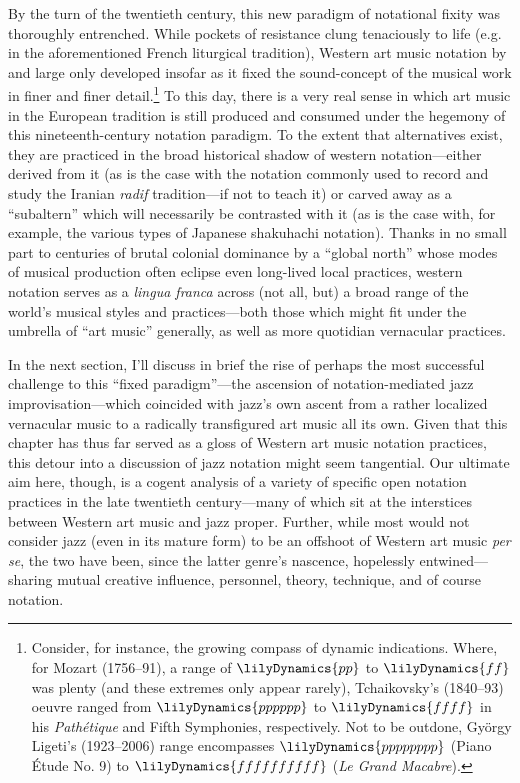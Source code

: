     By the turn of the twentieth century, this new paradigm of notational fixity was thoroughly entrenched. While pockets of resistance clung tenaciously to life (e.g. in the aforementioned French liturgical tradition), Western art music notation by and large only developed insofar as it fixed the sound-concept of the musical work in finer and finer detail.\footnote{
        Consider, for instance, the growing compass of dynamic indications. Where, for Mozart (1756--91), a range of $\lilyDynamics{pp}$ to $\lilyDynamics{ff}$ was plenty (and these extremes only appear rarely), Tchaikovsky's (1840--93) oeuvre ranged from $\lilyDynamics{pppppp}$ to $\lilyDynamics{ffff}$ in his \textit{Pathétique} and Fifth Symphonies, respectively. Not to be outdone, György Ligeti's (1923--2006) range encompasses $\lilyDynamics{pppppppp}$ (Piano Étude No. 9) to $\lilyDynamics{ffffffffff}$ (\textit{Le Grand Macabre}).
        } 
    To this day, there is a very real sense in which art music in the European tradition is still produced and consumed under the hegemony of this nineteenth-century notation paradigm. To the extent that alternatives exist, they are practiced in the broad historical shadow of western notation---either derived from it (as is the case with the notation commonly used to record and study the Iranian \textit{radif} tradition---if not to teach it) or carved away as a ``subaltern'' which will necessarily be contrasted with it (as is the case with, for example, the various types of Japanese shakuhachi notation). Thanks in no small part to centuries of brutal colonial dominance by a ``global north'' whose modes of musical production often eclipse even long-lived local practices, western notation serves as a \textit{lingua franca} across (not all, but) a broad range of the world's musical styles and practices---both those which might fit under the umbrella of ``art music'' generally, as well as more quotidian vernacular practices. 

    In the next section, I'll discuss in brief the rise of perhaps the most successful challenge to this ``fixed paradigm''---the ascension of notation-mediated jazz improvisation---which coincided with jazz's own ascent from a rather localized vernacular music to a radically transfigured art music all its own. Given that this chapter has thus far served as a gloss of Western art music notation practices, this detour into a discussion of jazz notation might seem tangential. Our ultimate aim here, though, is a cogent analysis of a variety of specific open notation practices in the late twentieth century---many of which sit at the interstices between Western art music and jazz proper. Further, while most would not consider jazz (even in its mature form) to be an offshoot of Western art music \textit{per se}, the two have been, since the latter genre's nascence, hopelessly entwined---sharing mutual creative influence, personnel, theory, technique, and of course notation.
    

